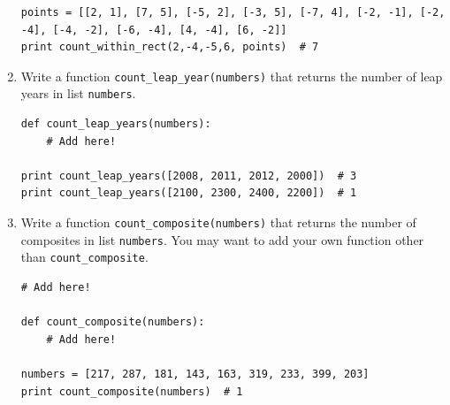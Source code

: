 \documentclass[../main.tex]{subfiles}
\begin{document}
\begin{enumerate}
\begin{verbatim}
points = [[2, 1], [7, 5], [-5, 2], [-3, 5], [-7, 4], [-2, -1], [-2, -4], [-4, -2], [-6, -4], [4, -4], [6, -2]]
print count_within_rect(2,-4,-5,6, points)  # 7
\end{verbatim}

\item Write a function \texttt{count\_leap\_year(numbers)} that returns the number of leap years in list \texttt{numbers}.
\begin{verbatim}
def count_leap_years(numbers):
    # Add here!

print count_leap_years([2008, 2011, 2012, 2000])  # 3
print count_leap_years([2100, 2300, 2400, 2200])  # 1
\end{verbatim}

\item Write a function \texttt{count\_composite(numbers)} that returns the number of composites in list \texttt{numbers}.
You may want to add your own function other than \texttt{count\_composite}.
\begin{verbatim}
# Add here!

def count_composite(numbers):
    # Add here!

numbers = [217, 287, 181, 143, 163, 319, 233, 399, 203]
print count_composite(numbers)  # 1
\end{verbatim}
\end{enumerate}
\end{document}
